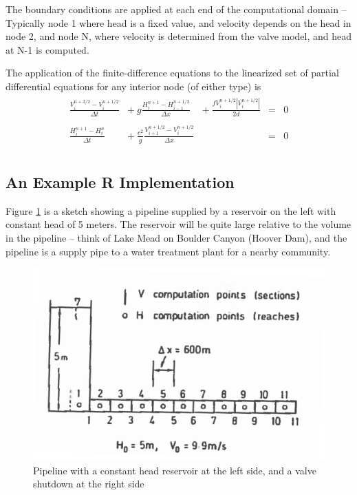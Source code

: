 The boundary conditions are applied at each end of the computational domain -- Typically node 1 where head is a fixed value, and velocity depends on the head in node 2, and node N, where velocity is determined from the valve model, and head at N-1 is computed.

The application of the finite-difference equations to the linearized set of partial differential equations for any interior node (of either type) is
\begin{gather}
\begin{matrix}
\frac{V_i^{n+3/2}-V_i^{n+1/2}}{\Delta t}  &+~g\frac{H_i^{n+1}-H_{i-1}^{n+1/2}}{\Delta x} &+~\frac{fV_i^{n+1/2}|V_i^{n+1/2}|}{2d} &= & 0 \\
\\
\frac{H_i^{n+1}-H_i^{n}}{\Delta t}  &+~\frac{c^2}{g}\frac{V_{i+1}^{n+1/2}-V_{i}^{n+1/2}}{\Delta x} & &= & 0\\
\end{matrix}
\end{gather}
\newpage
\subsection{An Example \textbf{R} Implementation}
Figure \ref{fig:PipelineExample} is a sketch showing a pipeline supplied by a reservoir on the left with constant head of 5 meters.  The reservoir will be quite large relative to the volume in the pipeline -- think of Lake Mead on Boulder Canyon (Hoover Dam), and the pipeline is a supply pipe to a water treatment plant for a nearby community.

\begin{figure}[h!] %
   \centering
   \includegraphics[width=6in]{./11-PipelineTransients/PipelineExample.jpg} 
   \caption{Pipeline with a constant head reservoir at the left side, and a valve shutdown at the right side}
   \label{fig:PipelineExample}
\end{figure}

